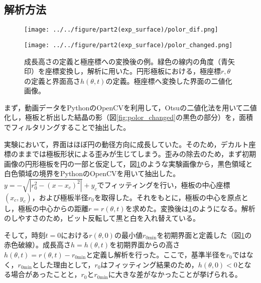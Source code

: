 \documentclass[autodetect-engine,dvi=dvipdfmx,a4paper,ja=standard,oneside,openany,11pt]{bxjsbook}
\begin{document}
\subsection{解析方法}
\begin{figure}[htbp]
  \begin{minipage}
    {0.64\textwidth}
    \subcaption{}
    \centering
    \texttt{[image: ../../figure/part2(exp\_surface)/polor\_dif.png]}
    \label{fig:surface_hight_def}
  \end{minipage}
  \begin{minipage}
    {0.32\textwidth}
    \subcaption{}
    \centering
    \texttt{[image: ../../figure/part2(exp\_surface)/polor\_changed.png]}
    \label{fig:polor_changed}
  \end{minipage}
  \caption{成長高さの定義と極座標への変換後の例。緑色の線内の角度（青矢印）を座標変換し，解析に用いた。円形極板における，極座標$r,\theta$の定義と界面高さ$h(\theta,t)$の定義。極座標へ変換した界面の二値化画像。}
  \label{fig:surface_hight_def_polor_changed}
\end{figure}
まず，動画データをPythonのOpenCVを利用して，Otsuの二値化法を用いて二値化し，極板と析出した結晶の影（図\ref{fig:polor_changed}の黒色の部分）を，面積でフィルタリングすることで抽出した。

実験において，界面はほぼ円の動径方向に成長していた。そのため，デカルト座標のままでは極板形状による歪みが生じてしまう。歪みの除去のため，まず初期画像の円形極板を円の一部と仮定して，図\ref{fig:surface_hight_def_polor_changed}のような実験画像から，黒色領域と白色領域の境界をPythonのOpenCVを用いて抽出した。$y=-\sqrt{|r_0^2-(x-x_c)^2|}+y_c$でフィッティングを行い，極板の中心座標$(x_c,y_c)$，および極板半径$r_0$を取得した。それをもとに，極板の中心を原点とし，極板の中心からの距離$r=r(\theta,t)$を求めた。変換後は\ref{fig:surface_hight_def_polor_changed}のようになる。解析のしやすさのため，ビット反転して黒と白を入れ替えている。

そして，時刻$t=0$における$r(\theta,0)$の最小値$r_{0\mathrm{min}}$を初期界面と定義した（図\ref{fig:surface_hight_def_polor_changed}の赤色破線）。成長高さ$h=h(\theta,t)$を初期界面からの高さ$h(\theta,t)=r(\theta,t)-r_{0\mathrm{min}}$と定義し解析を行った。ここで，基準半径を$r_0$ではなく，$r_{0\mathrm{min}}$とした理由として，$r_0$はフィッティング結果のため，$h(\theta,0)<0$となる場合があったことと，$r_0$と$r_{0\mathrm{min}}$に大きな差がなかったことが挙げられる。
\end{document}

